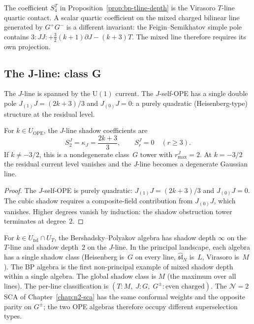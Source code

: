 \begin{remark}
\label{rem:bp-quartic-line-separation}
The coefficient $S_4^T$ in
Proposition~\ref{prop:bp-tline-depth} is the Virasoro
$T$-line quartic contact. A scalar quartic coefficient on the
mixed charged bilinear line generated by $G^+G^-$ is a different
invariant: the Feigin--Semikhatov simple pole contains
$3{:}JJ{:}+\tfrac32(k+1)\partial J-(k+3)T$.  The mixed line therefore
requires its own projection.
\end{remark}


\subsection{The J-line: class G}

The $J$-line is spanned by the $\mathrm{U}(1)$ current. The
$J$-self-OPE has a single double pole $J_{(1)}J = (2k+3)/3$
and $J_{(0)}J = 0$: a purely quadratic
(Heisenberg-type) structure at the residual level.

\begin{proposition}
\label{prop:bp-jline-depth}
For $k\in U_{\mathrm{OPE}}$, the $J$-line shadow coefficients are
\[
S_2^J=\kappa_J=\frac{2k+3}{3},\qquad
S_r^J=0\quad(r\ge3).
\]
If $k\ne -3/2$, this is a nondegenerate class~$G$ tower with
$r_{\max}^J=2$. At $k=-3/2$ the residual current level vanishes and
the $J$-line becomes a degenerate Gaussian line.
\end{proposition}

\begin{proof}
The $J$-self-OPE is purely quadratic: $J_{(1)}J = (2k+3)/3$
and $J_{(0)}J = 0$. The cubic shadow requires a composite-field
contribution from $J_{(0)}J$, which vanishes. Higher degrees
vanish by induction: the shadow obstruction tower terminates at
degree~$2$.
\end{proof}

\begin{remark}
\label{rem:bp-mixed-depth}
For $k\in U_{\mathrm{nd}}\cap U_T$, the Bershadsky--Polyakov algebra
has shadow depth $\infty$ on the $T$-line and shadow depth~$2$ on the
$J$-line. In the principal
landscape, each algebra has a single shadow class
(Heisenberg is~$G$ on every line, $\widehat{\mathfrak{sl}}_N$
is~$L$, Virasoro is~$M$). The BP algebra is the first
non-principal example of mixed shadow depth within a single algebra.
The global shadow class is $M$ (the maximum over all lines).
The per-line classification is
$(T\colon M,\; J\colon G,\; G^\pm\colon \text{even charged})$.
The $\mathcal{N}=2$ SCA of Chapter~\ref{chap:n2-sca} has the same
conformal weights and the opposite parity on $G^\pm$; the two OPE
algebras therefore occupy different superselection types.
\end{remark}


